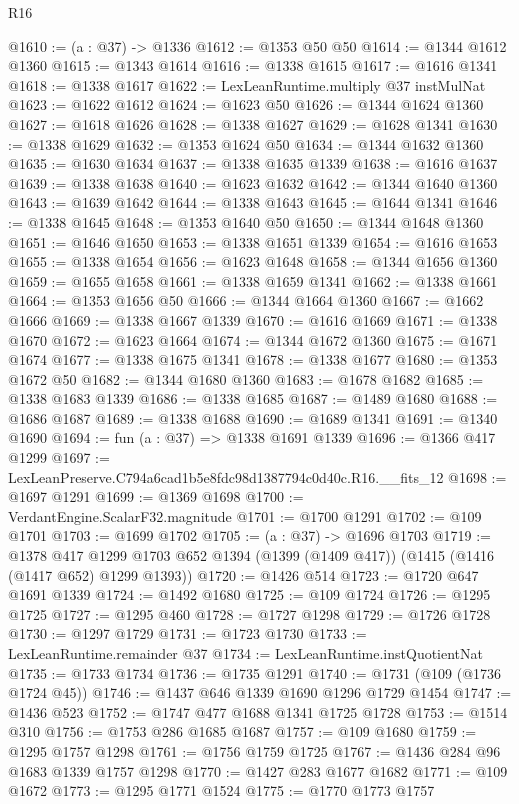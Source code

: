 \begin{lexlean}{R16}
\begin{coremodule}
@1610 := (a : @37) -> @1336
@1612 := @1353 @50 @50
@1614 := @1344 @1612 @1360
@1615 := @1343 @1614
@1616 := @1338 @1615
@1617 := @1616 @1341
@1618 := @1338 @1617
@1622 := LexLeanRuntime.multiply @37 instMulNat
@1623 := @1622 @1612
@1624 := @1623 @50
@1626 := @1344 @1624 @1360
@1627 := @1618 @1626
@1628 := @1338 @1627
@1629 := @1628 @1341
@1630 := @1338 @1629
@1632 := @1353 @1624 @50
@1634 := @1344 @1632 @1360
@1635 := @1630 @1634
@1637 := @1338 @1635 @1339
@1638 := @1616 @1637
@1639 := @1338 @1638
@1640 := @1623 @1632
@1642 := @1344 @1640 @1360
@1643 := @1639 @1642
@1644 := @1338 @1643
@1645 := @1644 @1341
@1646 := @1338 @1645
@1648 := @1353 @1640 @50
@1650 := @1344 @1648 @1360
@1651 := @1646 @1650
@1653 := @1338 @1651 @1339
@1654 := @1616 @1653
@1655 := @1338 @1654
@1656 := @1623 @1648
@1658 := @1344 @1656 @1360
@1659 := @1655 @1658
@1661 := @1338 @1659 @1341
@1662 := @1338 @1661
@1664 := @1353 @1656 @50
@1666 := @1344 @1664 @1360
@1667 := @1662 @1666
@1669 := @1338 @1667 @1339
@1670 := @1616 @1669
@1671 := @1338 @1670
@1672 := @1623 @1664
@1674 := @1344 @1672 @1360
@1675 := @1671 @1674
@1677 := @1338 @1675 @1341
@1678 := @1338 @1677
@1680 := @1353 @1672 @50
@1682 := @1344 @1680 @1360
@1683 := @1678 @1682
@1685 := @1338 @1683 @1339
@1686 := @1338 @1685
@1687 := @1489 @1680
@1688 := @1686 @1687
@1689 := @1338 @1688
@1690 := @1689 @1341
@1691 := @1340 @1690
@1694 := fun (a : @37) => @1338 @1691 @1339
@1696 := @1366 @417 @1299
@1697 := LexLeanPreserve.C794a6cad1b5e8fdc98d1387794c0d40c.R16.__fits_12
@1698 := @1697 @1291
@1699 := @1369 @1698
@1700 := VerdantEngine.ScalarF32.magnitude
@1701 := @1700 @1291
@1702 := @109 @1701
@1703 := @1699 @1702
@1705 := (a : @37) -> @1696 @1703
@1719 := @1378
    @417
    @1299
    @1703
    @652
    @1394
    (@1399 (@1409 @417))
    (@1415 (@1416 (@1417 @652) @1299 @1393))
@1720 := @1426 @514
@1723 := @1720 @647 @1691 @1339
@1724 := @1492 @1680
@1725 := @109 @1724
@1726 := @1295 @1725
@1727 := @1295 @460
@1728 := @1727 @1298
@1729 := @1726 @1728
@1730 := @1297 @1729
@1731 := @1723 @1730
@1733 := LexLeanRuntime.remainder @37
@1734 := LexLeanRuntime.instQuotientNat
@1735 := @1733 @1734
@1736 := @1735 @1291
@1740 := @1731 (@109 (@1736 @1724 @45))
@1746 := @1437 @646 @1339 @1690 @1296 @1729 @1454
@1747 := @1436 @523
@1752 := @1747 @477 @1688 @1341 @1725 @1728
@1753 := @1514 @310
@1756 := @1753 @286 @1685 @1687
@1757 := @109 @1680
@1759 := @1295 @1757 @1298
@1761 := @1756 @1759 @1725
@1767 := @1436 @284 @96 @1683 @1339 @1757 @1298
@1770 := @1427 @283 @1677 @1682
@1771 := @109 @1672
@1773 := @1295 @1771 @1524
@1775 := @1770 @1773 @1757

\end{coremodule}
\end{lexlean}
